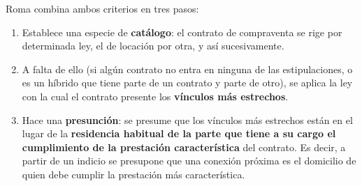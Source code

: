 \documentclass[12pt,oneside]{book}
\begin{document}
Roma combina ambos criterios en tres pasos:

\begin{enumerate}
    \item Establece una especie de \textbf{catálogo}: el contrato de compraventa se rige por determinada ley, el de locación por otra, y así sucesivamente.
    \item A falta de ello (si algún contrato no entra en ninguna de las estipulaciones, o es un híbrido que tiene parte de un contrato y parte de otro), se aplica la ley con la cual el contrato presente los \textbf{vínculos más estrechos}.
    \item Hace una \textbf{presunción}: se presume que los vínculos más estrechos están en el lugar de la \textbf{residencia habitual de la parte que tiene a su cargo el cumplimiento de la prestación característica} del contrato. Es decir, a partir de un indicio se presupone que una conexión próxima es el domicilio de quien debe cumplir la prestación más característica.
\end{enumerate}
\end{document}
